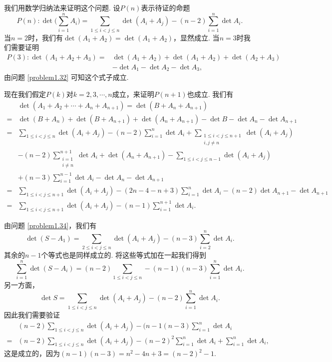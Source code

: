 \begin{solution}
  我们用数学归纳法来证明这个问题. 设$P(n)$表示待证的命题
  \[
    P(n):  \det \bigg( \sum_{i=1}^n A_i \bigg) =
    \sum_{1\le i<j\le n}\det(A_i+A_j) - (n-2)\sum_{i=1}^n\det A_i.
  \]
  当$n=2$时，我们有$\det(A_1+A_2)=\det(A_1+A_2)$，显然成立. 当$n=3$时我们需要证明
  \begin{align*}
    P(3): \det(A_1+A_2+A_3) = & {} \det(A_1+A_2) + \det(A_1+A_2) + \det(A_2+A_3) \\
    & - \det A_1 - \det A_2 - \det A_3,
  \end{align*}
  由问题 \ref{problem1.32} 可知这个式子成立.

  现在我们假定$P(k)$对$k=2,3,\cdots,n$成立，来证明$P(n+1)$也成立. 我们有
  \begin{align*}
    & \det (A_1 + A_2 + \cdots + A_n + A_{n+1}) = \det(B + A_n + A_{n+1}) \\
    = {} &\det(B + A_n) + \det (B + A_{n+1}) + \det (A_n + A_{n+1}) - \det B - \det A_n - \det A_{n+1} \\
    = {}& \sum_{1\le i<j\le n}\det(A_i+A_j) - (n-2)\sum_{i=1}^n \det A_i + \sum_{\substack{1\le i<j\le n+1\\i,j\ne n}}\det(A_i + A_j) \\
    & - (n-2)\sum_{\substack{i=1\\i\ne n}}^{n+1}\det A_i + \det(A_n+A_{n+1}) - \sum_{1\le i<j\le n-1}\det(A_i + A_j) \\
    & + (n-3)\sum_{i=1}^{n-1}\det A_i - \det A_n - \det A_{n+1} \\
    = {} & \sum_{1\le i<j\le n+1}\det(A_i + A_j) -
    (2n-4-n+3)\sum_{i=1}^n\det A_i - (n-2)\det A_{n+1} - \det A_{n+1} \\
    = {}& \sum_{1\le i<j\le n+1}\det(A_i + A_j) - (n-1)\sum_{i=1}^{n+1}\det A_i.
  \end{align*}
\end{solution}

\begin{solution}
  由问题  \ref{problem1.34}，我们有
  \[
    \det (S - A_1) = \sum_{2\le i<j\le n}\det (A_i + A_j) - (n-3)\sum_{i=2}^n\det A_i.
  \]
  其余的$n-1$个等式也是同样成立的. 将这些等式加在一起我们得到
  \[
    \sum_{i=1}^n\det(S-A_i) = (n-2)\sum_{1\le i<j\le n} - (n-1)(n-3)\sum_{i=1}^n\det A_i.
  \]
  另一方面，
  \[
    \det S = \sum_{1\le i<j\le n}\det(A_i + A_j) - (n-2)\sum_{i=1}^n\det A_i.
  \]
  因此我们需要验证
  \begin{align*}
    & (n-2)\sum_{1\le i<j\le n}\det(A_i+A_j) - (n-1(n-3)\sum_{i=1}^n\det A_i \\
    = {} & (n-2)\sum_{1\le i<j\le n}\det(A_i + A_j) - (n-2)^2 \sum_{i=1}^n\det A_i + \sum_{i=1}^n\det A_i,
  \end{align*}
  这是成立的，因为$(n-1)(n-3)=n^2-4n+3=(n-2)^2-1$.
\end{solution}

